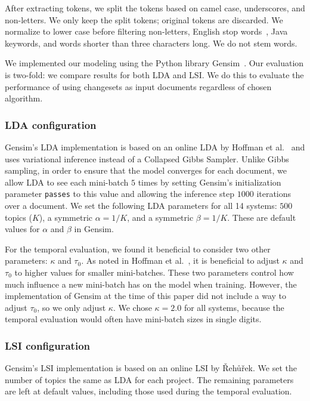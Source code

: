 After extracting tokens, we split the tokens based on camel case,
underscores, and non-letters.
We only keep the split tokens; original tokens are discarded.
We normalize to lower case before filtering non-letters, English stop words~\cite{StopWords}, Java keywords, and words shorter than three characters long.
We do not stem words. 

We implemented our modeling using the Python library Gensim~\cite{Gensim}.
Our evaluation is two-fold: we compare results for both LDA and LSI.
We do this to evaluate the performance of using changesets as input
documents regardless of chosen algorithm.

\subsubsection{LDA configuration}

Gensim's LDA implementation is based on an online LDA by Hoffman et al.~\cite{Hoffman-etal:2010}
and uses variational inference instead of a Collapsed Gibbs Sampler.
Unlike Gibbs sampling, in order to ensure that the model converges for each document,
we allow LDA to see each mini-batch $5$ times by setting Gensim's initialization parameter \texttt{passes} to this value
and allowing the inference step $1000$ iterations over a document.
We set the following LDA parameters for all 14 systems:
$500$ topics ($K$), a symmetric $\alpha=1/K$, and a symmetric $\beta=1/K$.
These are default values for $\alpha$ and $\beta$ in Gensim.

For the temporal evaluation, we found it beneficial to consider two other parameters: $\kappa$ and $\tau_0$.
As noted in Hoffman et al.~\cite{Hoffman-etal:2010}, it is beneficial to
adjust $\kappa$ and $\tau_0$ to higher values for smaller mini-batches.
These two parameters control how much influence a new mini-batch has on the model when training.
However, the implementation of Gensim at the time of this paper did not
include a way to adjust $\tau_0$, so we only adjust $\kappa$.
We chose $\kappa=2.0$ for all systems, because the temporal evaluation
would often have mini-batch sizes in single digits.

\subsubsection{LSI configuration}

Gensim's LSI implementation is based on an online LSI by {\v R}eh{\r u}{\v r}ek\cite{Radim:2011}.
We set the number of topics the same as LDA for each project.
The remaining parameters are left at default values, including those used
during the temporal evaluation.


